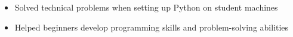 \begin{itemize}
  \item Solved technical problems when setting up Python on student machines
  \item Helped beginners develop programming skills and problem-solving abilities
\end{itemize}
\vspace{4pt}
